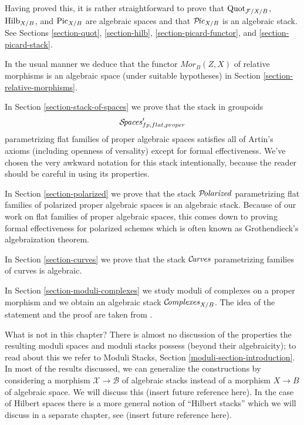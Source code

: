 \medskip\noindent
Having proved this, it is rather straightforward to prove that
$\mathrm{Quot}_{\mathcal{F}/X/B}$, $\mathrm{Hilb}_{X/B}$, and
$\mathrm{Pic}_{X/B}$ are algebraic spaces and that
$\mathcal{P}\!\mathit{ic}_{X/B}$ is an algebraic stack. See
Sections \ref{section-quot}, \ref{section-hilb},
\ref{section-picard-functor}, and \ref{section-picard-stack}.

\medskip\noindent
In the usual manner we deduce that the functor $\mathit{Mor}_B(Z, X)$
of relative morphisms is an algebraic space (under suitable
hypotheses) in Section \ref{section-relative-morphisms}.

\medskip\noindent
In Section \ref{section-stack-of-spaces} we prove that the stack in
groupoids
$$
\mathcal{S}\!\mathit{paces}'_{fp, flat, proper}
$$
parametrizing flat families of proper algebraic spaces satisfies all
of Artin's axioms (including openness of versality) except for
formal effectiveness. We've chosen the very awkward notation for
this stack intentionally, because the reader should be careful
in using its properties.

\medskip\noindent
In Section \ref{section-polarized} we prove that the stack
$\mathcal{P}\!\mathit{olarized}$
parametrizing flat families of polarized proper algebraic spaces
is an algebraic stack. Because of our work on flat families of proper
algebraic spaces, this comes down to proving
formal effectiveness for polarized schemes which is often known
as Grothendieck's algebraization theorem.

\medskip\noindent
In Section \ref{section-curves} we prove that the stack
$\mathcal{C}\!\mathit{urves}$ parametrizing families of curves is algebraic.

\medskip\noindent
In Section \ref{section-moduli-complexes}
we study moduli of complexes on a proper morphism
and we obtain an algebraic stack $\mathcal{C}\!\mathit{omplexes}_{X/B}$.
The idea of the statement and the proof are taken from
\cite{lieblich-complexes}.

\medskip\noindent
What is not in this chapter? There is almost no discussion of
the properties the resulting moduli spaces and moduli stacks
possess (beyond their algebraicity); to read about this we
refer to Moduli Stacks, Section \ref{moduli-section-introduction}.
In most of the results discussed, we can generalize the constructions
by considering a morphism $\mathcal{X} \to \mathcal{B}$ of algebraic
stacks instead of a morphism $X \to B$ of algebraic space.
We will discuss this (insert future reference here).
In the case of Hilbert spaces there is a more general notion of
``Hilbert stacks'' which we will discuss in a separate chapter, see
(insert future reference here).




